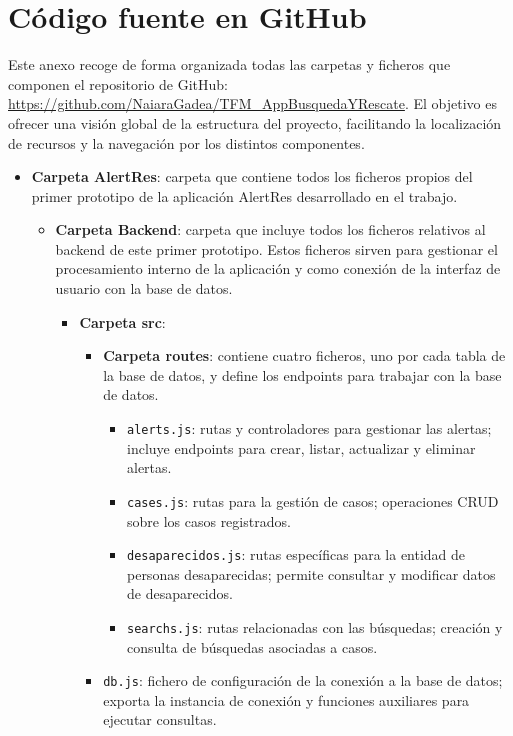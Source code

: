 \chapter{Código fuente en GitHub}

Este anexo recoge de forma organizada todas las carpetas y ficheros que componen el repositorio de GitHub: \url{https://github.com/NaiaraGadea/TFM_AppBusquedaYRescate}. El objetivo es ofrecer una visión global de la estructura del proyecto, facilitando la localización de recursos y la navegación por los distintos componentes.

\begin{itemize}
    \item \textbf{Carpeta AlertRes}: carpeta que contiene todos los ficheros propios del primer prototipo de la aplicación AlertRes desarrollado en el trabajo.
    \begin{itemize}
        \item \textbf{Carpeta Backend}: carpeta que incluye todos los ficheros relativos al backend de este primer prototipo. Estos ficheros sirven para gestionar el procesamiento interno de la aplicación y como conexión de la interfaz de usuario con la base de datos.
        \begin{itemize}
            \item \textbf{Carpeta src}:
            \begin{itemize}
                \item \textbf{Carpeta routes}: contiene cuatro ficheros, uno por cada tabla de la base de datos, y define los endpoints para trabajar con la base de datos.
                \begin{itemize}
                    \item \texttt{alerts.js}: rutas y controladores para gestionar las alertas; incluye endpoints para crear, listar, actualizar y eliminar alertas.
                    \item \texttt{cases.js}: rutas para la gestión de casos; operaciones CRUD sobre los casos registrados.
                    \item \texttt{desaparecidos.js}: rutas específicas para la entidad de personas desaparecidas; permite consultar y modificar datos de desaparecidos.
                    \item \texttt{searchs.js}: rutas relacionadas con las búsquedas; creación y consulta de búsquedas asociadas a casos.
                \end{itemize}
                \item \texttt{db.js}: fichero de configuración de la conexión a la base de datos; exporta la instancia de conexión y funciones auxiliares para ejecutar consultas.

\end{itemize}
\end{itemize}
\end{itemize}
\end{itemize}

